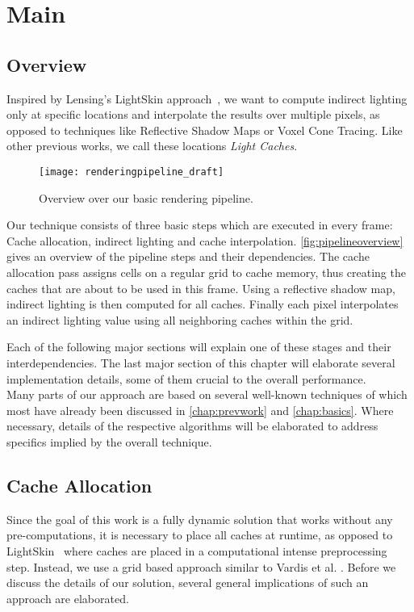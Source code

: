 \documentclass[thesis.tex]{subfiles}
\begin{document}
\chapter{Main}\label{chap:basics}

\section{Overview}
Inspired by Lensing's LightSkin approach~\cite{bib:LightskinPaper}, we want to compute indirect lighting only at specific locations and interpolate the results over multiple pixels, as opposed to techniques like Reflective Shadow Maps or Voxel Cone Tracing.
Like other previous works, we call these locations \emph{Light Caches}.

\begin{figure}[h]
	\centering
	\texttt{[image: renderingpipeline\_draft]}
	\caption{Overview over our basic rendering pipeline.}
	\label{fig:pipelineoverview}
\end{figure} 
Our technique consists of three basic steps which are executed in every frame: Cache allocation, indirect lighting and cache interpolation.
\autoref{fig:pipelineoverview} gives an overview of the pipeline steps and their dependencies.
The cache allocation pass assigns cells on a regular grid to cache memory, thus creating the caches that are about to be used in this frame.
Using a reflective shadow map, indirect lighting is then computed for all caches.
Finally each pixel interpolates an indirect lighting value using all neighboring caches within the grid.

Each of the following major sections will explain one of these stages and their interdependencies.
The last major section of this chapter will elaborate several implementation details, some of them crucial to the overall performance.\\
Many parts of our approach are based on several well-known techniques of which most have already been discussed in \autoref{chap:prevwork} and \autoref{chap:basics}.
Where necessary, details of the respective algorithms will be elaborated to address specifics implied by the overall technique.

\section{Cache Allocation}
Since the goal of this work is a fully dynamic solution that works without any pre-computations, it is necessary to place all caches at runtime, as opposed to LightSkin~\cite{bib:LightskinPaper} where caches are placed in a computational intense preprocessing step.
Instead, we use a grid based approach similar to Vardis et al. \cite{bib:radiancecachechromaticcompression}.
Before we discuss the details of our solution, several general implications of such an approach are elaborated.
\end{document}
